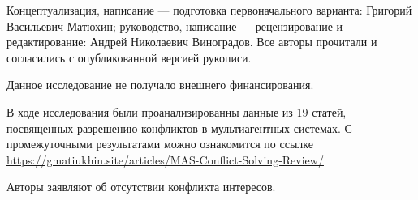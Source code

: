 \documentclass[%
]{ittmm}
\begin{document}
\vspace{\baselineskip}

\begin{authorcontributions}
  Концептуализация, написание --- подготовка первоначального варианта: Григорий Васильевич Матюхин;
  руководство, написание --- рецензирование и редактирование: Андрей Николаевич Виноградов.
  Все авторы прочитали и согласились с опубликованной версией рукописи.
\end{authorcontributions}

\begin{funding}
  Данное исследование не получало внешнего финансирования.
\end{funding}

\begin{dataavailability}
  В ходе исследования были проанализированны данные из 19 статей,
  посвященных разрешению конфликтов в мультиагентных системах. 
  С промежуточными результатами можно ознакомится по ссылке \url{https://gmatiukhin.site/articles/MAS-Conflict-Solving-Review/}
\end{dataavailability}

\begin{conflictsofinterest}
  Авторы заявляют об отсутствии конфликта интересов.
\end{conflictsofinterest}

\printbibliography

%
%
\end{document}
